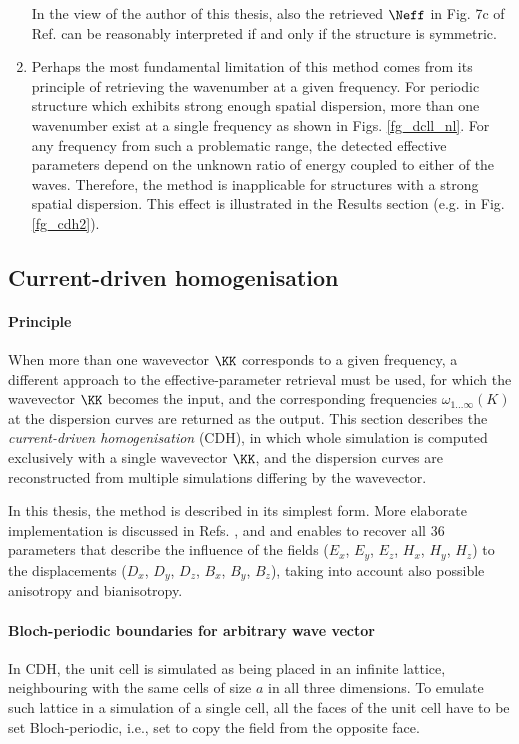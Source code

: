\begin{enumerate}
{\begin{displayquote}
 \end{displayquote}
 In the view of the author of this thesis, also the retrieved $\Neff$ in Fig. 7c of Ref. \cite[p. 036617-9]{smith2005electromagnetic} can be reasonably interpreted if and only if the structure is symmetric. 
			 }
	     \item{Perhaps the most fundamental limitation of this method comes from its principle of retrieving the wavenumber at a given frequency. For periodic structure which exhibits strong enough spatial dispersion, more than one wavenumber exist at a single frequency as shown in Figs. \ref{fg_dcll_nl}. For any frequency from such a problematic range, the detected effective parameters depend on the unknown ratio of energy coupled to either of the waves. Therefore, the method is inapplicable for structures with a strong spatial dispersion. This effect is illustrated in the Results section (e.g. in Fig. \ref{fg_cdh2}).
			 }
\end{enumerate}


\subsection{Current-driven homogenisation} 
\paragraph{Principle} %
When more than one wavevector $\KK$ corresponds to a given frequency,  
a different approach to the effective-parameter retrieval must be used, for which the wavevector $\KK$ becomes the input, and the corresponding frequencies $\omega_{1\ldots\infty}(K)$  at the dispersion curves are returned as the output. 
This section describes the \textit{current-driven homogenisation} (CDH), in which whole simulation is computed exclusively with a single wavevector $\KK$, and the dispersion curves are reconstructed from multiple simulations differing by the wavevector. 

In this thesis, the method is described in its simplest form. More elaborate implementation is discussed in Refs. \cite{silveirinha2007metamaterial}, \cite{fietz2010current} and \cite{fietz2011homogenization} and enables to recover all 36 parameters that describe the influence of the fields ($E_x$, $E_y$, $E_z$, $H_x$, $H_y$, $H_z$) to the displacements ($D_x$, $D_y$, $D_z$, $B_x$, $B_y$, $B_z$), taking into account also possible anisotropy and bianisotropy.

\paragraph{Bloch-periodic boundaries for arbitrary wave vector} %
In CDH, the unit cell is simulated as being placed in an infinite lattice, neighbouring with the same cells of size $a$ in all three dimensions. To emulate such lattice in a simulation of a single cell, all the faces of the unit cell have to be set Bloch-periodic, i.e., set to copy the field from the opposite face.

